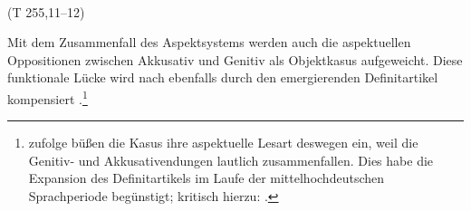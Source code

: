 \begin{exe}
	\ex \label{ex:bilan}   \\   (T 255,11--12)
\end{exe}
\noindent
Mit dem Zusammenfall des Aspektsystems werden auch die aspektuellen Oppositionen zwischen Akkusativ und Genitiv als Objektkasus aufgeweicht. Diese funktionale Lücke wird nach \textcite[187ff.]{Leiss2000} ebenfalls durch den emergierenden Definitartikel kompensiert \parencite[vgl. auch][46f.]{Abraham1997}.\footnote{\textcite[88f.]{Philippi1997} zufolge büßen die Kasus ihre aspektuelle Lesart deswegen ein, weil die Genitiv- und Akkusativendungen lautlich zusammenfallen. Dies habe die Expansion des Definitartikels im Laufe der mittelhochdeutschen Sprachperiode begünstigt; kritisch hierzu: \textcite[234f.]{Lyons1999}.}

